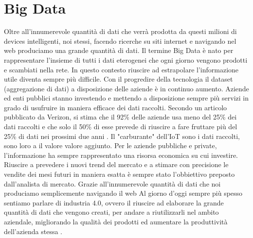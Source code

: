 \section{Big Data}
Oltre all'innumerevole quantità di dati che verrà prodotta da questi milioni di
devices intelligenti, noi stessi, facendo ricerche su siti internet e navigando
nel web produciamo una grande quantità di dati. Il termine Big Data è nato per
rappresentare l'insieme di tutti i dati eterogenei che ogni giorno vengono
prodotti e scambiati nella rete.
In questo contesto riuscire ad estrapolare l'informazione utile diventa sempre
più difficile. Con il progredire della tecnologia il dataset (aggregazione di
dati) a disposizione delle aziende è in continuo aumento. Aziende ed enti
pubblici stanno investendo e mettendo a disposizione sempre più servizi in grado
di usufruire in maniera efficace dei dati raccolti. Secondo un articolo
pubblicato da Verizon, si stima che il 92\% delle aziende usa meno del 25\% dei
dati raccolti e che solo il 50\% di esse prevede di riuscire a fare fruttare più
del 25\% di dati nei prossimi due anni \cite{Verizon}.
Il "carburante" dell'IoT sono i dati raccolti, sono loro a il valore
valore aggiunto. Per le aziende pubbliche e private, l'informazione ha
sempre rappresentato una risorsa economica su cui investire. Riuscire a
prevedere i nuovi trend del mercato e a stimare con precisione le vendite dei
mesi futuri in maniera esatta è sempre stato l'obbiettivo preposto dall'analista
di mercato.
Grazie all'innumerevole quantità di dati che noi produciamo semplicemente
navigando il web 
Al giorno d'oggi sempre più spesso sentiamo parlare di industria 4.0, ovvero il
riuscire ad elaborare la grande quantità di dati che vengono creati, per andare
a riutilizzarli nel ambito aziendale, migliorando la qualità dei prodotti ed
aumentare la produttività dell'azienda stessa .
 
